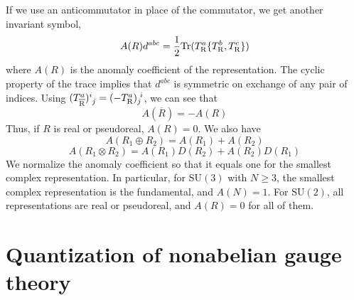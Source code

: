 If we use an anticommutator in place of the commutator, we get another invariant symbol,
\[A(R)d^{abc} = \frac{1}{2} \mathrm{Tr}(T^a_{\rm R}\{T^b_{\rm R},T^c_{\rm R}\})\]
where $A(R)$ is the anomaly coefficient of the representation. The cyclic property of the trace implies that $d^{abc}$ is symmetric on exchange of any pair of indices. Using $(T^{a}_{\rm \overline{R}})^{i}_{\phantom{i}j} = (-T^{a}_{\rm R})_{j}^{\phantom{i}i}$, we can see that
\[A(\overline{R}) = -A(R)\]
Thus, if $R$ is real or pseudoreal, $A(R) = 0$. We also have
\[A(R_1\oplus R_2) = A(R_1) + A(R_2)\]
\[A(R_1\otimes R_2) = A(R_1)D(R_2) + A(R_2)D(R_1)\]
We normalize the anomaly coefficient so that it equals one for the smallest complex representation. In particular, for $\mathrm{SU}(3)$ with $N \geq 3$, the smallest complex representation is the fundamental, and $A(N) = 1$. For $\mathrm{SU}(2)$, all representations are real or pseudoreal, and $A(R) = 0$ for all of them.

\section{Quantization of nonabelian gauge theory}
